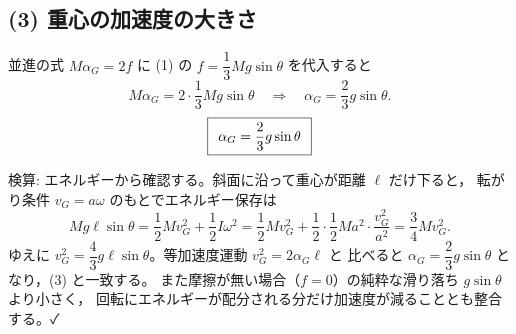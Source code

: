 \documentclass[11pt,a4paper]{article}
\begin{document}
\subsection*{(3) 重心の加速度の大きさ}
並進の式 $M\alpha_G=2f$ に (1) の $f=\dfrac{1}{3}Mg\sin\theta$ を代入すると
\[
  M\alpha_G=2\cdot\frac{1}{3}Mg\sin\theta
  \quad\Longrightarrow\quad
  \alpha_G=\frac{2}{3}g\sin\theta.
\]
\[
  \boxed{\,\;\alpha_G=\dfrac{2}{3}g\sin\theta\;\,}
\]

\medskip
検算: エネルギーから確認する。斜面に沿って重心が距離 $\ell$ だけ下ると，
転がり条件 $v_G=a\omega$ のもとでエネルギー保存は
\[
  Mg\ell\sin\theta=\frac{1}{2}Mv_G^2+\frac{1}{2}I\omega^2
  =\frac{1}{2}Mv_G^2+\frac{1}{2}\cdot\frac{1}{2}Ma^2\cdot\frac{v_G^2}{a^2}
  =\frac{3}{4}Mv_G^2.
\]
ゆえに $v_G^2=\dfrac{4}{3}g\ell\sin\theta$。等加速度運動 $v_G^2=2\alpha_G\ell$ と
比べると $\alpha_G=\dfrac{2}{3}g\sin\theta$ となり，(3) と一致する。
また摩擦が無い場合（$f=0$）の純粋な滑り落ち $g\sin\theta$ より小さく，
回転にエネルギーが配分される分だけ加速度が減ることとも整合する。✓
\end{document}
